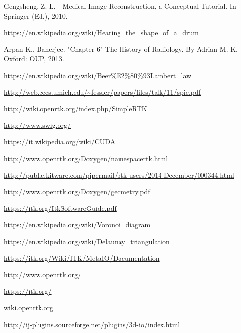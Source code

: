 \documentclass[a4paper,12pt, doubleside]{report}
\begin{document}
\begin{thebibliography}{1}
        Gengsheng, Z. L. - Medical Image Reconstruction, a Conceptual Tutorial. In Springer (Ed.), 2010.
    
        \url{https://en.wikipedia.org/wiki/Hearing_the_shape_of_a_drum}
    
        Arpan K., Banerjee. "Chapter 6" The History of Radiology. By Adrian M. K. Oxford: OUP, 2013.
        
        \url{https://en.wikipedia.org/wiki/Beer%E2%80%93Lambert_law}
        
        \url{http://web.eecs.umich.edu/~fessler/papers/files/talk/11/spie.pdf}    
        
        \url{http://wiki.openrtk.org/index.php/SimpleRTK}
        
        \url{http://www.swig.org/}    
        
        \url{https://it.wikipedia.org/wiki/CUDA}
        
        \url{http://www.openrtk.org/Doxygen/namespacertk.html}
        
        \url{http://public.kitware.com/pipermail/rtk-users/2014-December/000344.html}
    
        \url{http://www.openrtk.org/Doxygen/geometry.pdf}
        
        \url{https://itk.org/ItkSoftwareGuide.pdf}   
        
        \url{https://en.wikipedia.org/wiki/Voronoi_diagram}
        
        \url{https://en.wikipedia.org/wiki/Delaunay_triangulation}
        
        \url{https://itk.org/Wiki/ITK/MetaIO/Documentation} 

    




        \url{http://www.openrtk.org/}
    
        \url{https://itk.org/}
        
        \url{wiki.openrtk.org}

        \url{http://ij-plugins.sourceforge.net/plugins/3d-io/index.html}
        

\end{thebibliography}
\end{document}
